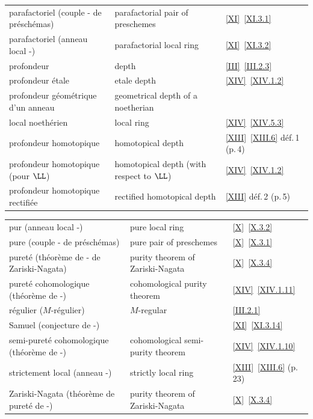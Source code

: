 \begin{footnotesize}
\begin{tabular}{lll}
parafactoriel (couple - de pr\'e\-sch\'emas) & parafactorial pair of preschemes & \ref{XI}~\ref{XI.3.1}\\
parafactoriel (anneau local -) & parafactorial local ring & \ref{XI}~\ref{XI.3.2}\\
profondeur & depth & \ref{III}~\ref{III.2.3}\\
profondeur \'etale & etale depth & \ref{XIV}~\ref{XIV.1.2}\\
profondeur g\'eom\'etrique d'un anneau & geometrical depth of a noetherian &\\
local noeth\'erien & local ring & \ref{XIV}~\ref{XIV.5.3}\\
profondeur homotopique & homotopical depth & \ref{XIII}~\ref{XIII.6} d\'ef.\,1 (p.\,4)\\
profondeur homotopique (pour $\LL$) & homotopical depth (with respect to $\LL$) & \ref{XIV}~\ref{XIV.1.2}\\
profondeur homotopique rectifi\'ee & rectified homotopical depth & \ref{XIII} d\'ef.\,2 (p.\,5)\\
\end{tabular}
\newpage
\begin{tabular}{lll}
pur (anneau local -) & pure local ring & \ref{X}~\ref{X.3.2} \\
pure (couple - de pr\'esch\'emas) & pure pair of preschemes & \ref{X}~\ref{X.3.1}\\
puret\'e (th\'eor\`eme de - de Zariski-Nagata) & purity theorem of Zariski-Nagata & \ref{X}~\ref{X.3.4}\\
puret\'e cohomologique (th\'eor\`eme de -) & cohomological purity theorem & \ref{XIV}~\ref{XIV.1.11}\\
r\'egulier ($M$-r\'egulier) & $M$-regular & \ref{III.2.1}\\
Samuel (conjecture de -) & & \ref{XI}~\ref{XI.3.14}\\
semi-puret\'e cohomologique (th\'eor\`eme de -) & cohomological semi-purity theorem & \ref{XIV}~\ref{XIV.1.10}\\
strictement local (anneau -) & strictly local ring & \ref{XIII}~\ref{XIII.6} (p.\,23)\\
Zariski-Nagata (th\'eor\`eme de puret\'e de -) & purity theorem of Zariski-Nagata & \ref{X}~\ref{X.3.4}
\end{tabular}
\end{footnotesize}

